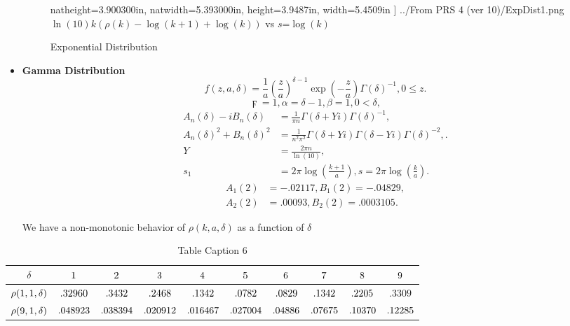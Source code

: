 \documentclass[titlepage,fleqn]{article}%
\begin{document}
\begin{itemize}
\begin{figure}[H]
{{\begin{center}
natheight=3.900300in,
natwidth=5.393000in,
height=3.9487in,
width=5.4509in
]%
{../From PRS 4  (ver 10)/ExpDist1.png}%
\\
$\ln(10)k(\rho(k)-\log(k+1)+\log(k))$ vs $s$=$\log(k)$%
\end{center}}}
\caption{Exponential Distribution}\label{figureKey3}%
\end{figure}%


\item \textbf{Gamma Distribution}%
\[
f(z,a,\delta)=\frac{1}{a}\left(  \frac{z}{a}\right)  ^{\delta-1}\exp\left(
-\frac{z}{a}\right)  \Gamma\left(  \delta\right)  ^{-1},0\leq z.
\]%
\[
\digamma=1,\alpha=\delta-1,\beta=1,0<\delta,
\]%
\begin{align}
A_{n}(\delta)-iB_{n}(\delta)  &  =\frac{1}{\pi n}\Gamma\left(  \delta
+Yi\right)  \Gamma\left(  \delta\right)  ^{-1},\\
A_{n}(\delta)^{2}+B_{n}(\delta)^{2}  &  =\frac{1}{n^{2}\pi^{2}}\Gamma\left(
\delta+Yi\right)  \Gamma\left(  \delta-Yi\right)  \Gamma\left(  \delta\right)
^{-2},.\\
Y  &  =\frac{2\pi n}{\ln(10)},\\
s_{1}  &  =2\pi\log\left(  \frac{k+1}{a}\right)  ,s=2\pi\log\left(  \frac
{k}{a}\right)  .
\end{align}%
\begin{align}
A_{1}(2)  &  =-.02117,B_{1}(2)=-.04829,\\
A_{2}(2)  &  =.00093,B_{2}(2)=.0003105.
\end{align}


We have a non-monotonic behavior of $\rho(k,a,\delta)$ as a function of
$\delta$
\end{itemize}

%

\begin{table}[!htbp] \centering
\begin{tabular}
[c]{|c|c|c|c|c|c|c|c|c|c|}\hline\hline
$\delta$ & ${\small 1}$ & ${\small 2}$ & ${\small 3}$ & ${\small 4}$ &
${\small 5}$ & ${\small 6}$ & ${\small 7}$ & ${\small 8}$ & ${\small 9}%
$\\\hline
${\small \rho(1,1,\delta)}$ & ${\small .32960}$ & ${\small .3432}$ &
${\small .2468}$ & ${\small .1342}$ & ${\small .0782}$ & ${\small .0829}$ &
${\small .1342}$ & ${\small .2205}$ & {\small .}$3309$\\\hline
${\small \rho(9,1,\delta)}$ & ${\small .048923}$ & ${\small .038394}$ &
${\small .020912}$ & ${\small .016467}$ & ${\small .027004}$ &
${\small .04886}$ & ${\small .07675}$ & ${\small .10370}$ & ${\small .12285}%
$\\\hline\hline
\end{tabular}
\caption{Table Caption 6}\label{TableKey6}%
\end{table}%
\end{document}
